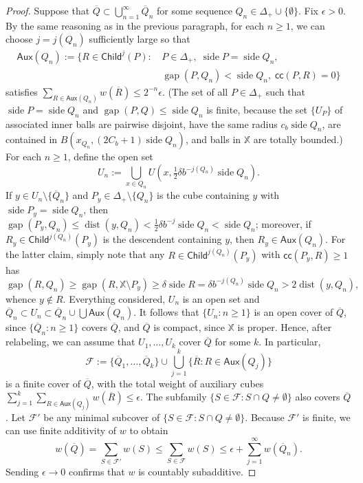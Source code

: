 \documentclass[12pt]{amsart}
\theoremstyle{definition}
\theoremstyle{remark}
\newcommand{\XX}{\mathbb{X}}
\newcommand{\dist}{\mathop\mathrm{dist}\nolimits}
\newcommand{\side}{\mathop\mathrm{side}\nolimits}
\newcommand{\gap}{\mathop\mathrm{gap}\nolimits}
\newcommand{\Child}{\mathsf{Child}}
\numberwithin{figure}{section}
\numberwithin{equation}{section}
\begin{document}
\begin{proof}
Suppose that $\overline{Q}\subset \bigcup_{n=1}^\infty \overline{Q}_n$ for some sequence $Q_n\in\Delta_+\cup\{\emptyset\}$. Fix $\epsilon>0$. By the same reasoning as in the previous paragraph, for each $n\geq 1$, we can choose $j=j(Q_n)$ sufficiently large so that \begin{align*}\mathsf{Aux}(Q_n):=\{R\in \Child^j(P):\, &P\in\Delta_+,\; \side P=\side Q_n,\;\\
 &\gap(P,Q_n)<\side Q_n,\; \mathsf{cc}(P,R)=0\}\end{align*} satisfies $\sum_{R\in\mathsf{Aux}(Q_n)}w(\overline{R})\leq 2^{-n}\epsilon$. (The set of all $P\in\Delta_+$ such that $\side P=\side Q_n$ and $\gap(P,Q)\leq \side Q_n$ is finite, because the set $\{U_P\}$ of associated inner balls are pairwise disjoint, have the same radius $c_b \side Q_n$, are contained in $B(x_{Q_n},(2C_b+1)\side Q_n)$, and balls in $\XX$ are totally bounded.) For each $n\geq 1$, define the open set $$U_n:=\bigcup_{x\in Q_n} U\left(x,\tfrac{1}{2}\delta b^{-j(Q_n)}\side Q_n\right).$$ If $y\in U_n\setminus \{\overline{Q}_n\}$ and $P_y\in\Delta_+\setminus\{Q_n\}$ is the cube containing $y$ with $\side P_y=\side Q_n$, then $\gap(P_y,Q_n)\leq \dist(y,Q_n)<\frac{1}{2}\delta b^{-j}\side Q_n<\side Q_n$; moreover, if $R_y\in\Child^{j(Q_n)}(P_y)$ is the descendent containing $y$, then $R_y\in\mathsf{Aux}(Q_n)$. For the latter claim, simply note that any $R\in\Child^{j(Q_n)}(P_y)$ with $\mathsf{cc}(P_y,R)\geq 1$ has $$\gap(R,Q_n)\geq \gap(R,\XX\setminus P_y)\geq \delta \side R=\delta b^{-j(Q_n)}\side Q_n>2\dist(y,Q_n),$$ whence $y\not\in R$. Everything considered, $U_n$ is an open set and $\overline{Q}_n\subset U_n\subset \overline{Q}_n\cup\bigcup\mathsf{Aux}(Q_n)$. It follows that $\{U_n:n\geq 1\}$ is an open cover of $\overline{Q}$, since $\{\overline{Q}_n: n\geq 1\}$ covers $\overline{Q}$, and  $\overline{Q}$ is compact, since $\XX$ is proper. Hence, after relabeling, we can assume that $U_1,\dots, U_k$ cover $\overline{Q}$ for some $k$. In particular, $$\mathcal{F}:=\{\overline{Q}_1,\dots,\overline{Q}_k\}\cup\bigcup_{j=1}^k \{\overline{R}:R\in\mathsf{Aux}(Q_j)\}$$ is a finite cover of $\overline{Q}$, with the total weight of auxiliary cubes $\sum_{j=1}^k\sum_{R\in\mathsf{Aux}(Q_j)}w(\overline{R})\leq \epsilon$. The subfamily $\{S\in\mathcal{F}:S\cap Q\neq\emptyset\}$ also covers $\overline{Q}$. Let $\mathcal{F}'$ be any minimal subcover of $\{S\in\mathcal{F}:S\cap Q\neq\emptyset\}$.
Because $\mathcal{F}'$ is finite, we can use finite additivity of $w$ to obtain $$w(\overline{Q})=\sum_{S\in\mathcal{F}'}w(S)\leq \sum_{S\in\mathcal{F}}w(S) \leq \epsilon+\sum_{j=1}^\infty w(\overline{Q}_n).$$ Sending $\epsilon\to 0$ confirms that $w$ is countably subadditive.
\end{proof}
\end{document}
